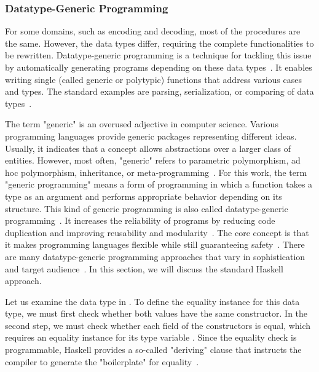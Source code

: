 \begin{frame}\frametitle{Datatype-Generic Programming}
    
 For some domains, such as encoding and decoding, most of the procedures are the same. However, the data types differ, requiring the complete functionalities to be rewritten. Datatype-generic programming is a technique for tackling this issue by automatically generating programs depending on these data types~\cite{comparing-generic-approaches, datatype-generic-programming}. 
    It enables writing single (called generic or polytypic) functions that address various cases and types. The standard examples are parsing,  serialization, or comparing of data types~\cite{derivable-type-classes}.
    
    The term "generic" is an overused adjective in computer science. 
    Various programming languages provide generic packages 
    representing different ideas. 
    Usually, it indicates that a concept allows abstractions over a larger class of entities. 
    However, most often, "generic" refers to parametric polymorphism, 
    ad hoc polymorphism, inheritance, or meta-programming~\cite{optimizing-generics,datatype-generic-programming}.  
    For this work, the term "generic programming" means a form of programming in which a function takes a type as an argument and performs appropriate behavior depending on its structure. 
    This kind of generic programming is also called datatype-generic programming~\cite{comparing-generic-approaches, datatype-generic-programming}.
    It increases the reliability of programs by reducing code duplication and improving reusability and modularity~\cite{optimizing-generics}.
    The core concept is that it makes programming languages flexible while still guaranteeing safety~\cite{datatype-generic-programming}.
    There are many datatype-generic programming approaches that vary in sophistication and target audience~\cite{comparing-generic-approaches, optimizing-generics}.
    In this section, we will discuss the standard Haskell approach.
    
    Let us examine the data type   in . 
    To define the equality instance for this data type, we must first check whether both values have the same constructor. In the second step, we must check whether each field of the constructors is equal, which requires an equality instance for its type variable . Since the equality check is programmable, Haskell provides a so-called "deriving" clause that instructs the compiler to generate the "boilerplate" for equality~\cite{derivable-type-classes, meta-hs}. 
    

\end{frame}
